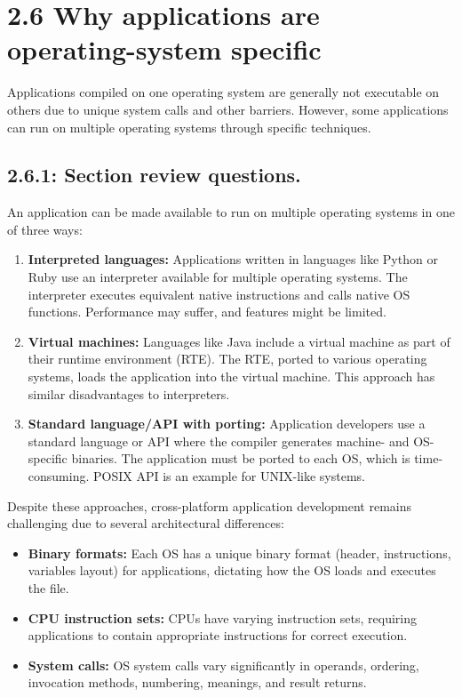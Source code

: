 \section*{2.6 Why applications are operating-system specific}

Applications compiled on one operating system are generally not executable on others due to unique system calls and other barriers. However, some applications can run on multiple operating systems through specific techniques.

\subsection*{2.6.1: Section review questions.}

An application can be made available to run on multiple operating systems in one of three ways:
\begin{enumerate}
    \item \textbf{Interpreted languages:} Applications written in languages like Python or Ruby use an interpreter available for multiple operating systems. The interpreter executes equivalent native instructions and calls native OS functions. Performance may suffer, and features might be limited.
    \item \textbf{Virtual machines:} Languages like Java include a virtual machine as part of their runtime environment (RTE). The RTE, ported to various operating systems, loads the application into the virtual machine. This approach has similar disadvantages to interpreters.
    \item \textbf{Standard language/API with porting:} Application developers use a standard language or API where the compiler generates machine- and OS-specific binaries. The application must be ported to each OS, which is time-consuming. POSIX API is an example for UNIX-like systems.
\end{enumerate}

Despite these approaches, cross-platform application development remains challenging due to several architectural differences:
\begin{itemize}
    \item \textbf{Binary formats:} Each OS has a unique binary format (header, instructions, variables layout) for applications, dictating how the OS loads and executes the file.
    \item \textbf{CPU instruction sets:} CPUs have varying instruction sets, requiring applications to contain appropriate instructions for correct execution.
    \item \textbf{System calls:} OS system calls vary significantly in operands, ordering, invocation methods, numbering, meanings, and result returns.
\end{itemize}

